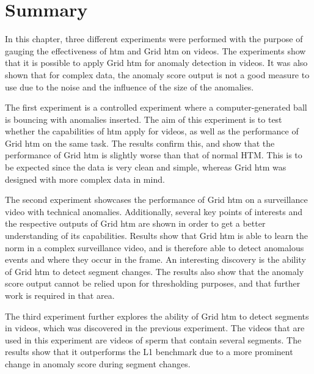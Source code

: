 \section{Summary}
In this chapter, three different experiments were performed with the purpose of gauging the effectiveness of \gls*{htm} and Grid \gls*{htm} on videos. The experiments show that it is possible to apply Grid \gls*{htm} for anomaly detection in videos. It was also shown that for complex data, the anomaly score output is not a good measure to use due to the noise and the influence of the size of the anomalies.
\par
The first experiment is a controlled experiment where a computer-generated ball is bouncing with anomalies inserted. The aim of this experiment is to test whether the capabilities of \gls*{htm} apply for videos, as well as the performance of Grid \gls*{htm} on the same task. The results confirm this, and show that the performance of Grid \gls*{htm} is slightly worse than that of normal HTM. This is to be expected since the data is very clean and simple, whereas Grid \gls*{htm} was designed with more complex data in mind.
\par
The second experiment showcases the performance of Grid \gls*{htm} on a surveillance video with technical anomalies. Additionally, several key points of interests and the respective outputs of Grid \gls*{htm} are shown in order to get a better understanding of its capabilities.  Results show that Grid \gls*{htm} is able to learn the norm in a complex surveillance video, and is therefore able to detect anomalous events and where they occur in the frame. An interesting discovery is the ability of Grid \gls*{htm} to detect segment changes. The results also show that the anomaly score output cannot be relied upon for thresholding purposes, and that further work is required in that area.
\par
The third experiment further explores the ability of Grid \gls*{htm} to detect segments in videos, which was discovered in the previous experiment. The videos that are used in this experiment are videos of sperm that contain several segments. The results show that it outperforms the L1 benchmark due to a more prominent change in anomaly score during segment changes.

